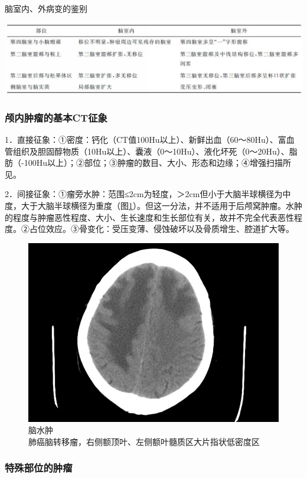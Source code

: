 \begin{table}[htbp]
\centering
\caption{脑室内、外病变的鉴别}
\label{tab2-5}
\includegraphics[width=\textwidth,height=\textheight,keepaspectratio]{./images/Image00064.jpg}
\end{table}

\subsubsection{颅内肿瘤的基本CT征象}

1．直接征象：①密度：钙化（CT值100Hu以上）、新鲜出血（60～80Hu）、富血管组织及胆固醇物质（10Hu以上）、囊液（0～10Hu）、液化坏死（0～20Hu）、脂肪（-100Hu以上）；②部位；③肿瘤的数目、大小、形态和边缘；④增强扫描所见。

2．间接征象：①瘤旁水肿：范围≤2cm为轻度，＞2cm但小于大脑半球横径为中度，大于大脑半球横径为重度（图\ref{fig2-38}）。但这一分法，并不适用于后颅窝肿瘤。水肿的程度与肿瘤恶性程度、大小、生长速度和生长部位有关，故并不完全代表恶性程度。②占位效应。③骨变化：受压变薄、侵蚀破坏以及骨质增生、腔道扩大等。

\begin{figure}[!htbp]
 \centering
 \includegraphics[width=.7\textwidth,height=\textheight,keepaspectratio]{./images/Image00065.jpg}
 \captionsetup{justification=centering}
 \caption{脑水肿\\{\small 肺癌脑转移瘤，右侧额顶叶、左侧额叶髓质区大片指状低密度区}}
 \label{fig2-38}
  \end{figure} 

\subsubsection{特殊部位的肿瘤}

